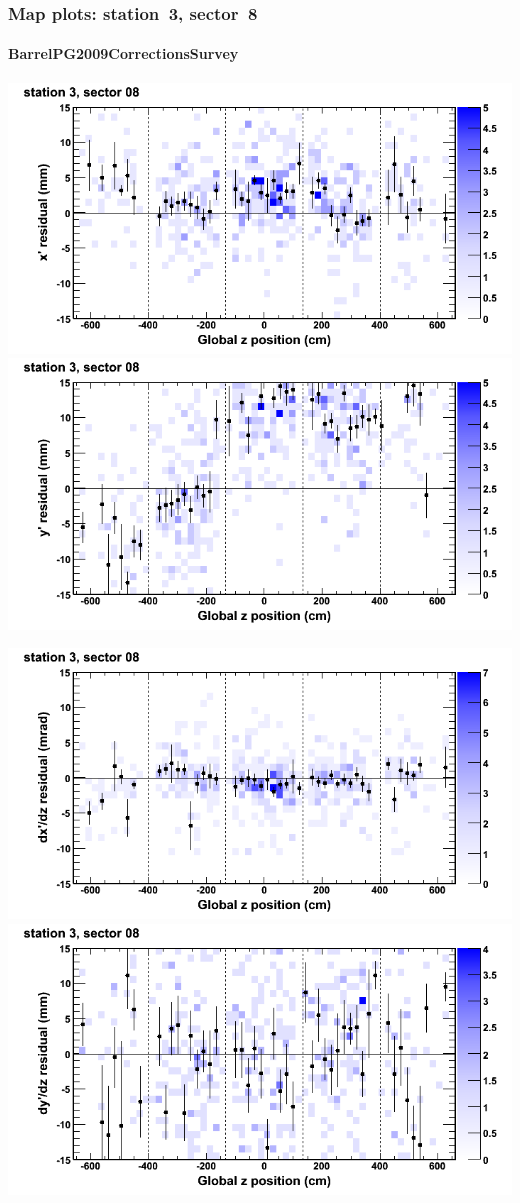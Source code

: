 \documentclass[compress]{beamer}
\begin{document}
\begin{frame}
\frametitle{Map plots: station~3, sector~8}
\framesubtitle{BarrelPG2009CorrectionsSurvey}
\includegraphics[width=0.5\linewidth]{mapplots_01/DTvsz_st3sec08_x.png}
\includegraphics[width=0.5\linewidth]{mapplots_01/DTvsz_st3sec08_y.png}

\includegraphics[width=0.5\linewidth]{mapplots_01/DTvsz_st3sec08_dxdz.png}
\includegraphics[width=0.5\linewidth]{mapplots_01/DTvsz_st3sec08_dydz.png}
\end{frame}
\end{document}
